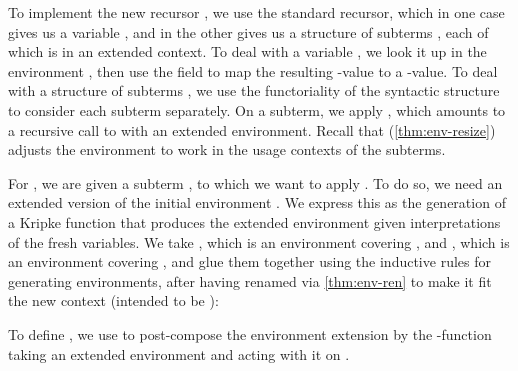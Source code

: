 
To implement the new recursor , we use the standard
recursor, which in one case gives us a variable , and in the other
gives us a structure of subterms , each of which is in an extended
context.
To deal with a variable , we look it
up in the environment \AgdaBound{$\rho$}, then use the
 field to map the resulting
\AgdaBound{$\V$}-value to a \AgdaBound{$\C$}-value.
To deal with a structure of subterms , we use the functoriality of
the syntactic structure to consider each subterm separately.
On a subterm, we apply , which amounts to a recursive call
to  with an extended environment.
Recall that  (\cref{thm:env-resize}) adjusts the
environment \AgdaBound{$\rho$} to work in the usage contexts of the subterms.


For , we are given a subterm , to
which we want to apply .  To do so, we need an
extended version of the initial environment \AgdaBound{$\rho$}. We
express this as the generation of a Kripke function that produces the
extended environment given interpretations of the fresh variables. We
take \AgdaBound{$\rho$}, which is an environment covering
\AgdaBound{$\Delta$}, and \AgdaBound{$\sigma$}, which is an
environment covering \AgdaBound{$\Theta$}, and glue them together
using the inductive rules for generating environments, after having
renamed \AgdaBound{$\rho$} via \cref{thm:env-ren} to make it fit the
new context \AgdaBound{$\Gamma^+$} (intended to be
):


To define , we use  to
post-compose the environment extension by the
\AgdaSymbol{$\lambda$}-function taking an extended environment and
acting with it on .



